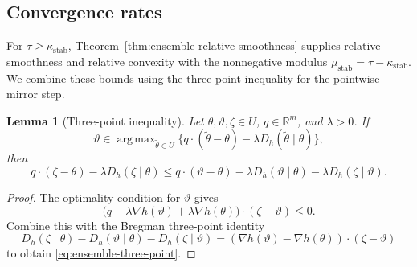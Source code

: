 \documentclass[11pt]{amsart}
\numberwithin{equation}{section} %
\DeclareMathOperator*{\argmax}{arg\,max}
\newtheorem{lemma}{Lemma}[section]
\theoremstyle{remark}
\begin{document}
\subsection{Convergence rates}
\label{subsec:ensemble-convergence-rates}

For $\tau\ge\kappa_{\mathrm{stab}}$,
Theorem~\ref{thm:ensemble-relative-smoothness} supplies relative
smoothness and relative convexity with the nonnegative modulus
$\mu_{\mathrm{stab}}=\tau-\kappa_{\mathrm{stab}}$.
We combine these bounds using the three-point inequality for the
pointwise mirror step.

\begin{lemma}[Three-point inequality]
\label{lem:ensemble-three-point}
Let $\theta,\vartheta,\zeta\in U$, $q\in\mathbb R^m$, and
$\lambda>0$. If
\[
\vartheta\in\argmax_{\widetilde\theta\in U}
\{q\cdot(\widetilde\theta-\theta)-\lambda D_h(\widetilde\theta\mid\theta)\},
\]
then
\begin{equation}
\label{eq:ensemble-three-point}
q\cdot(\zeta-\theta)-\lambda D_h(\zeta\mid\theta)
\le q\cdot(\vartheta-\theta)-\lambda D_h(\vartheta\mid\theta)
-\lambda D_h(\zeta\mid\vartheta).
\end{equation}
\end{lemma}

\begin{proof}
The optimality condition for $\vartheta$ gives
\[
\bigl(q-\lambda\nabla h(\vartheta)+\lambda\nabla h(\theta)\bigr)
\cdot(\zeta-\vartheta)\le0.
\]
Combine this with the Bregman three-point identity
\[
D_h(\zeta\mid\theta)-D_h(\vartheta\mid\theta)-D_h(\zeta\mid\vartheta)
=(\nabla h(\vartheta)-\nabla h(\theta))\cdot(\zeta-\vartheta)
\]
to obtain \eqref{eq:ensemble-three-point}.
\end{proof}
\end{document}
